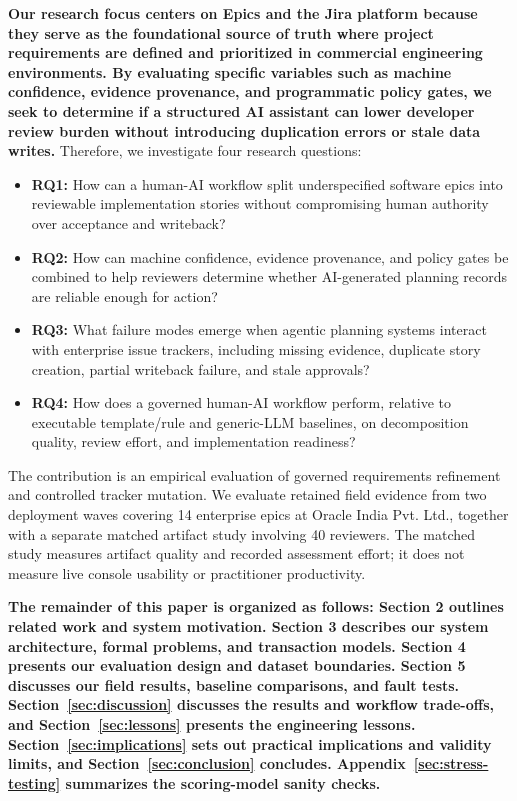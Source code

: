 \documentclass[pdflatex,sn-basic]{sn-jnl}
\begin{document}
\textbf{Our research focus centers on Epics and the Jira platform because they serve as the foundational source of truth where project requirements are defined and prioritized in commercial engineering environments. By evaluating specific variables such as machine confidence, evidence provenance, and programmatic policy gates, we seek to determine if a structured AI assistant can lower developer review burden without introducing duplication errors or stale data writes.} Therefore, we investigate four research questions:

\begin{itemize}
    \item \textbf{RQ1:} How can a human-AI workflow split underspecified software epics into reviewable implementation stories without compromising human authority over acceptance and writeback?
    \item \textbf{RQ2:} How can machine confidence, evidence provenance, and policy gates be combined to help reviewers determine whether AI-generated planning records are reliable enough for action?
    \item \textbf{RQ3:} What failure modes emerge when agentic planning systems interact with enterprise issue trackers, including missing evidence, duplicate story creation, partial writeback failure, and stale approvals?
    \item \textbf{RQ4:} How does a governed human-AI workflow perform, relative to executable template/rule and generic-LLM baselines, on decomposition quality, review effort, and implementation readiness?
\end{itemize}

The contribution is an empirical evaluation of governed requirements refinement and controlled tracker mutation. We evaluate retained field evidence from two deployment waves covering 14 enterprise epics at Oracle India Pvt. Ltd., together with a separate matched artifact study involving 40 reviewers. The matched study measures artifact quality and recorded assessment effort; it does not measure live console usability or practitioner productivity.

\textbf{The remainder of this paper is organized as follows: Section 2 outlines related work and system motivation. Section 3 describes our system architecture, formal problems, and transaction models. Section 4 presents our evaluation design and dataset boundaries. Section 5 discusses our field results, baseline comparisons, and fault tests. Section~\ref{sec:discussion} discusses the results and workflow trade-offs, and Section~\ref{sec:lessons} presents the engineering lessons. Section~\ref{sec:implications} sets out practical implications and validity limits, and Section~\ref{sec:conclusion} concludes. Appendix~\ref{sec:stress-testing} summarizes the scoring-model sanity checks.}
\end{document}
